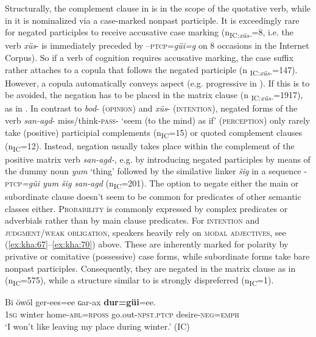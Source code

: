 \documentclass[output=paper,colorlinks,citecolor=brown,chinesefont]{langscibook}
\begin{document}
Structurally, the complement clause in  is in the scope of the quotative verb, while in  it is nominalized via a case-marked nonpast participle. It is exceedingly rare for negated participles to receive accusative case marking (n\textsubscript{IC:}\textit{\textsubscript{xüs-}}=8, i.e. the verb \textit{xüs}{}- is immediately preceded by –\textsc{ptcp}=\textit{güi=g} on 8 occasions in the Internet Corpus). So if a verb of cognition requires accusative marking, the case suffix rather attaches to a copula that follows the negated participle (n\textsubscript{ IC:}\textit{\textsubscript{xüs-}}=147). However, a copula automatically conveys aspect (e.g. progressive in ). If this is to be avoided, the negation has to be placed in the matrix clause (n\textsubscript{ IC:}\textit{\textsubscript{xüs-}}=1917), as in  . In contrast to \textit{bod}{}- (\textsc{opinion}) and \textit{xüs}{}- (\textsc{intention}), negated forms of the verb \textit{san-agd}{}- miss/think-\textsc{pass}{}- ‘seem (to the mind) as if’ (\textsc{perception}) only rarely take (positive) participial complements (n\textsubscript{IC}=15) or quoted complement clauses (n\textsubscript{IC}=12). Instead, negation usually takes place within the complement of the positive matrix verb \textit{san-agd-}, e.g. by introducing negated participles by means of the dummy noun \textit{yum} ‘thing’ followed by the similative linker \textit{šig} in a sequence \textsc{-ptcp}\textit{=güi yum šig san-agd} (n\textsubscript{IC}=201). The option to negate either the main or subordinate clause doesn’t seem to be common for predicates of other semantic classes either. \textsc{Probability} is commonly expressed by complex predicates or adverbials rather than by main clause predicates. For \textsc{intention} and \textsc{judgment/weak} \textsc{obligation}, speakers heavily rely on \textsc{modal} \textsc{adjectives}, see (\ref{ex:kha:67}--\ref{ex:kha:70}) above. These are inherently marked for polarity by privative or comitative (possessive) case forms, while subordinate forms take bare nonpast participles. Consequently, they are negated in the matrix clause as in  (n\textsubscript{IC}=575), while a structure similar to  is strongly dispreferred  (n\textsubscript{IC}=1). 

\ea\label{ex:kha:86}
    \gll Bi öwöl ger-ees=ee ɢar-ax \textbf{dur=güi}=ee. \\
         \textsc{1sg} winter home-\textsc{abl=rposs} go.out-\textsc{npst.ptcp} desire-\textsc{neg=emph}\\
    \glt ‘I won’t like leaving my place during winter.’ (IC)
\z 
\end{document}
